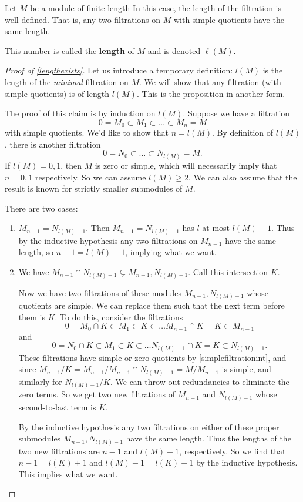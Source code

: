 \begin{proposition}\label{lengthexists} Let $M$ be a module of finite length
In this case, the length of the filtration is well-defined. That is, any two filtrations
on $M$ with simple quotients have the same length.
\end{proposition} 
\begin{definition} 
This number is called the \textbf{length} of $M$ and is denoted $\ell(M)$.
\end{definition} 
\begin{proof}[Proof of \cref{lengthexists}] 
Let us introduce a temporary definition: $l(M)$ is the length of the
\emph{minimal} filtration on $M$. We will show that any filtration (with
simple quotients) is of length
$l(M)$. This is the proposition in another form.

The proof of this claim is by induction on $l(M)$. Suppose we have a filtration
\[ 0 = M_0 \subset M_1 \subset \dots \subset M_n = M  \]
with simple quotients. We'd like to show that $n  = l(M)$. By definition of
$l(M)$, there is another filtration
\[ 0 = N_0 \subset \dots \subset N_{l(M)} = M.  \]
If $l(M) = 0,1$, then $M$ is zero or simple, which will necessarily imply that $n=0,1$
respectively. So we can assume $l(M)  \geq 2$. We can also assume that the
result is known for strictly smaller submodules of $M$.

There are two cases:
\begin{enumerate}
\item $M_{n-1} = N_{l(M) -1 } $. Then $M_{n-1} = N_{l(M)-1}$ has $l$ at most
$l(M)-1$. Thus by the inductive hypothesis any two filtrations on $M_{n-1}$
have the same length, so $n-1 = l(M) -1$, implying what we want. 
\item We have $M_{n-1} \cap N_{l(M) - 1} \subsetneq M_{n-1}, N_{l(M)-1}$. 
Call this intersection $K$. 

Now we have two  filtrations of these modules $M_{n-1}, N_{l(M)-1}$ whose
quotients are simple. We can replace them such that the next
term before them is $K$. 
To do this, consider the filtrations
\[ 0 = M_0 \cap K \subset M_1 \subset K \subset \dots M_{n-1} \cap K = K
\subset M_{n-1}  \]
and
\[ 0 = N_0 \cap K \subset M_1 \subset K \subset \dots N_{l(M)-1} \cap K = K
\subset N_{l(M)-1} . \]
These filtrations have simple or zero quotients by
\cref{simplefiltrationint}, and since $ M_{n-1}/K =
M_{n-1}/M_{n-1} \cap N_{l(M)-1} = M/M_{n-1}$ is simple, and similarly for
$N_{l(M)-1}/K$. We can throw out redundancies to eliminate
the zero terms. 
So we get two new filtrations of $M_{n-1}$ and $N_{l(M)-1}$ whose second-to-last
term is $K$.

By the
inductive hypothesis any two filtrations on either of these proper submodules $M_{n-1},
N_{l(M)-1} $
have the same length. 
Thus the lengths of the two new filtrations are $n-1$ and $l(M)-1$,
respectively.
So we find that $n-1 = l(K) +1$ and $l(M)-1 = l(K)+1$ by
the inductive hypothesis. This implies what we want.
\end{enumerate}
\end{proof} 

